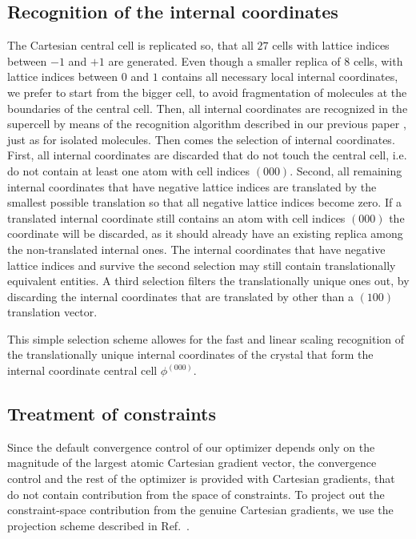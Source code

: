 \documentclass[prl,aps,preprint,superbib,12pt]{revtex4}
\begin{document}
\subsection{Recognition of the internal coordinates}
The Cartesian central cell is replicated so, that all $27$ 
cells with lattice indices between $-1$ and $+1$ are generated.
Even though a smaller replica of 8 cells, with lattice indices
between $0$ and $1$ contains all necessary local internal coordinates,
we prefer to start from the bigger cell, to avoid fragmentation
of molecules at the boundaries of the central cell.
Then, all internal coordinates are recognized in the supercell
by means of the recognition algorithm described in our previous paper
\cite{KNemeth04}, just as for isolated molecules.
Then comes the selection of internal coordinates.
First, all internal coordinates are discarded that do not touch 
the central cell, i.e. do not contain at least one atom with
cell indices $(000)$.
Second, all remaining internal coordinates that have 
negative lattice indices
are translated by the smallest possible translation so that all 
negative lattice indices become zero. If a translated 
internal coordinate
still contains an atom with cell indices $(000)$
the coordinate will be discarded, as it should already have an existing
replica among the non-translated internal ones.
The internal coordinates that have negative
lattice indices and survive the second selection may still
contain translationally equivalent entities. A third selection
filters the translationally unique ones out, by discarding
the internal coordinates that are translated 
by other than a $(100)$ translation vector.

This simple selection scheme allowes for the fast and linear scaling 
recognition of the translationally unique internal coordinates
of the crystal that form the internal coordinate central 
cell $\phi^{(000)}$.


\subsection{Treatment of constraints}
Since the default convergence control of our optimizer
depends only on the magnitude of the largest atomic Cartesian gradient  
vector, the convergence control and the rest of the optimizer
is provided with Cartesian gradients, that do not contain contribution
from the space of constraints. To project out the constraint-space
contribution from the genuine Cartesian gradients, we use the 
projection scheme described in Ref.~.
\end{document}
